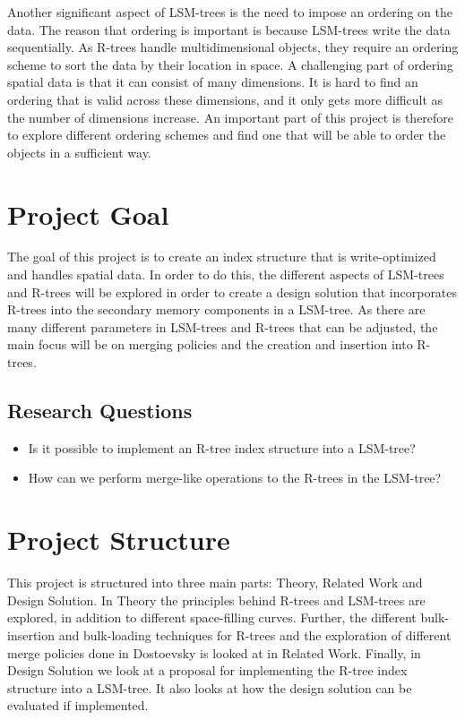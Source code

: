 \noindent
Another significant aspect of LSM-trees is the need to impose an ordering on the data. The reason that ordering is important is because LSM-trees write the data sequentially. As R-trees handle multidimensional objects, they require an ordering scheme to sort the data by their location in space. A challenging part of ordering spatial data is that it can consist of many dimensions. It is hard to find an ordering that is valid across these dimensions, and it only gets more difficult as the number of dimensions increase. An important part of this project is therefore to explore different ordering schemes and find one that will be able to order the objects in a sufficient way.

\section{Project Goal}
The goal of this project is to create an index structure that is write-optimized and handles spatial data. In order to do this, the different aspects of LSM-trees and R-trees will be explored in order to create a design solution that incorporates R-trees into the secondary memory components in a LSM-tree. As there are many different parameters in LSM-trees and R-trees that can be adjusted, the main focus will be on merging policies and the creation and insertion into R-trees. 

\subsection{Research Questions}
\begin{itemize}
    \item Is it possible to implement an R-tree index structure into a LSM-tree?
    \item How can we perform merge-like operations to the R-trees in the LSM-tree?
\end{itemize}

\section{Project Structure}
This project is structured into three main parts: Theory, Related Work and Design Solution. In Theory the principles behind R-trees and LSM-trees are explored, in addition to different space-filling curves. Further, the different bulk-insertion and bulk-loading techniques for R-trees and the exploration of different merge policies done in Dostoevsky\cite{Dostoevsky} is looked at in Related Work. Finally, in Design Solution we look at a proposal for implementing the R-tree index structure into a LSM-tree. It also looks at how the design solution can be evaluated if implemented. 
